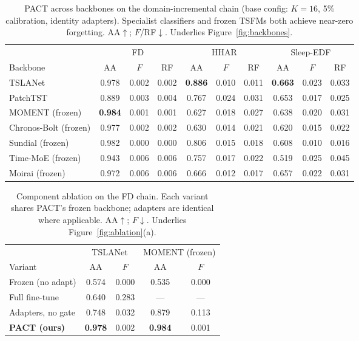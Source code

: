 \begin{table}[t]
\centering
\caption{PACT across backbones on the domain-incremental chain (base config:
$K{=}16$, 5\% calibration, identity adapters). Specialist classifiers and
frozen TSFMs both achieve near-zero forgetting. AA$\uparrow$; $F$/RF$\downarrow$.
Underlies Figure~\ref{fig:backbones}.}
\label{tab:backbones}
\small
\begin{tabular}{l ccc ccc ccc}
\toprule
& \multicolumn{3}{c}{FD} & \multicolumn{3}{c}{HHAR} & \multicolumn{3}{c}{Sleep-EDF}\\
\cmidrule(lr){2-4}\cmidrule(lr){5-7}\cmidrule(lr){8-10}
Backbone & AA & $F$ & RF & AA & $F$ & RF & AA & $F$ & RF\\
\midrule
TSLANet & 0.978 & 0.002 & 0.002 & \textbf{0.886} & 0.010 & 0.011 & \textbf{0.663} & 0.023 & 0.033\\
PatchTST & 0.889 & 0.003 & 0.004 & 0.767 & 0.024 & 0.031 & 0.653 & 0.017 & 0.025\\
MOMENT (frozen) & \textbf{0.984} & 0.001 & 0.001 & 0.627 & 0.018 & 0.027 & 0.638 & 0.020 & 0.031\\
Chronos-Bolt (frozen) & 0.977 & 0.002 & 0.002 & 0.630 & 0.014 & 0.021 & 0.620 & 0.015 & 0.022\\
Sundial (frozen) & 0.982 & 0.000 & 0.000 & 0.806 & 0.015 & 0.018 & 0.608 & 0.010 & 0.016\\
Time-MoE (frozen) & 0.943 & 0.006 & 0.006 & 0.757 & 0.017 & 0.022 & 0.519 & 0.025 & 0.045\\
Moirai (frozen) & 0.972 & 0.006 & 0.006 & 0.666 & 0.012 & 0.017 & 0.657 & 0.022 & 0.031\\
\bottomrule
\end{tabular}
\end{table}

\begin{table}[t]
\centering
\caption{Component ablation on the FD chain. Each variant shares PACT's frozen
backbone; adapters are identical where applicable. AA$\uparrow$; $F$$\downarrow$.
Underlies Figure~\ref{fig:ablation}(a).}
\label{tab:components}
\small
\begin{tabular}{l cc cc}
\toprule
& \multicolumn{2}{c}{TSLANet} & \multicolumn{2}{c}{MOMENT (frozen)}\\
\cmidrule(lr){2-3}\cmidrule(lr){4-5}
Variant & AA & $F$ & AA & $F$\\
\midrule
Frozen (no adapt) & 0.574 & 0.000 & 0.535 & 0.000\\
Full fine-tune & 0.640 & 0.283 & --- & ---\\
Adapters, no gate & 0.748 & 0.032 & 0.879 & 0.113\\
\textbf{PACT (ours)} & \textbf{0.978} & 0.002 & \textbf{0.984} & 0.001\\
\bottomrule
\end{tabular}
\end{table}

